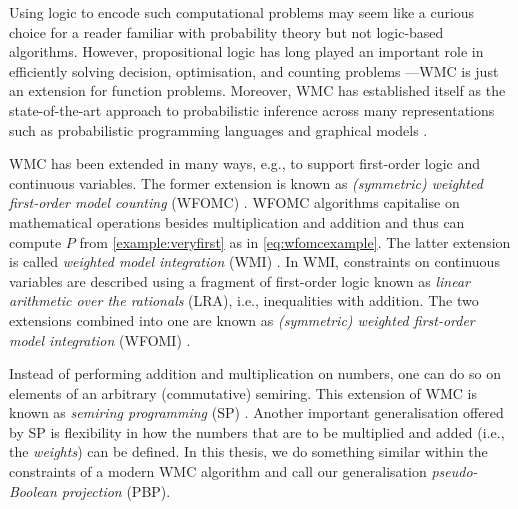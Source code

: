 Using logic to encode such computational problems may seem like a curious choice
for a reader familiar with probability theory but not logic-based algorithms.
However, propositional logic has long played an important role in efficiently
solving decision, optimisation, and counting problems
\citep{DBLP:series/faia/2009-185}---WMC is just an extension for function
problems. Moreover, WMC has established itself as the state-of-the-art approach
to probabilistic inference across many representations such as probabilistic
programming languages \citep{DBLP:journals/ijar/RiguzziBZCL17} and graphical
models \citep{DBLP:conf/ijcai/AgrawalPM21}.


WMC has been extended in many ways, e.g., to support first-order logic and
continuous variables. The former extension is known as \emph{(symmetric)
  weighted first-order model counting} (WFOMC)
\citep{DBLP:conf/ijcai/BroeckTMDR11}. WFOMC algorithms capitalise on
mathematical operations besides multiplication and addition and thus can compute
$P$ from \cref{example:veryfirst} as in \cref{eq:wfomcexample}. The latter
extension is called \emph{weighted model integration} (WMI)
\citep{DBLP:conf/ijcai/BellePB15}. In WMI, constraints on continuous variables
are described using a fragment of first-order logic known as \emph{linear
  arithmetic over the rationals} (LRA), i.e., inequalities with addition. The
two extensions combined into one are known as \emph{(symmetric) weighted
  first-order model integration} (WFOMI) \citep{DBLP:conf/uai/FeldsteinB21}.

Instead of performing addition and multiplication on numbers, one can do so on
elements of an arbitrary (commutative) semiring. This extension of WMC is known
as \emph{semiring programming} (SP) \citep{DBLP:journals/ijar/BelleR20}. Another
important generalisation offered by SP is flexibility in how the numbers that
are to be multiplied and added (i.e., the \emph{weights}) can be defined. In
this thesis, we do something similar within the constraints of a modern WMC
algorithm and call our generalisation \emph{pseudo-Boolean projection} (PBP).


